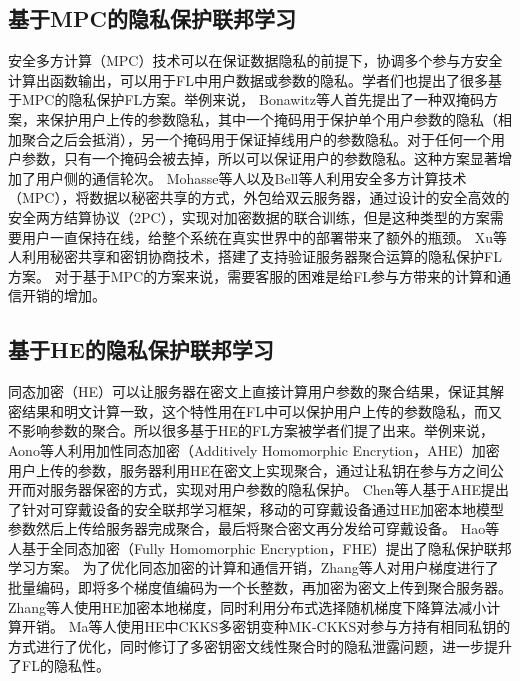 \subsection{基于MPC的隐私保护联邦学习}
安全多方计算（MPC）技术可以在保证数据隐私的前提下，协调多个参与方安全计算出函数输出，可以用于FL中用户数据或参数的隐私。学者们也提出了很多基于MPC的隐私保护FL方案\cite{bonawitz2017practical, mohassel2017secureml, mugunthan2019smpai, reich2019privacy, sharma2019secure, so2020scalable, xu2019hybridalpha, zhu2020privacy}。举例来说，
Bonawitz等人\cite{bonawitz2017practical}首先提出了一种双掩码方案，来保护用户上传的参数隐私，其中一个掩码用于保护单个用户参数的隐私（相加聚合之后会抵消），另一个掩码用于保证掉线用户的参数隐私。对于任何一个用户参数，只有一个掩码会被去掉，所以可以保证用户的参数隐私。这种方案显著增加了用户侧的通信轮次。
Mohasse等人\cite{mohassel2017secureml}以及Bell等人\cite{bell2020secure}利用安全多方计算技术（MPC），将数据以秘密共享的方式，外包给双云服务器，通过设计的安全高效的安全两方结算协议（2PC），实现对加密数据的联合训练，但是这种类型的方案需要用户一直保持在线，给整个系统在真实世界中的部署带来了额外的瓶颈。
Xu等人\cite{xu2019hybridalpha}利用秘密共享\cite{shamir1979share}和密钥协商技术\cite{hellman1976new}，搭建了支持验证服务器聚合运算的隐私保护FL方案。
对于基于MPC的方案来说，需要客服的困难是给FL参与方带来的计算和通信开销的增加。


\subsection{基于HE的隐私保护联邦学习}
同态加密（HE）可以让服务器在密文上直接计算用户参数的聚合结果，保证其解密结果和明文计算一致，这个特性用在FL中可以保护用户上传的参数隐私，而又不影响参数的聚合。所以很多基于HE的FL方案\cite{asad2020fedopt, chen2020fedhealth, dong2020eastfly, hao2019efficient, hardy2017private, aono2017privacy, zhang2020batchcrypt, zhang2020privacy, zhao2020smss}被学者们提了出来。举例来说，
Aono等人\cite{aono2017privacy}利用加性同态加密（Additively Homomorphic Encrytion，AHE）加密用户上传的参数，服务器利用HE在密文上实现聚合，通过让私钥在参与方之间公开而对服务器保密的方式，实现对用户参数的隐私保护。
Chen等人\cite{chen2020fedhealth}基于AHE提出了针对可穿戴设备的安全联邦学习框架，移动的可穿戴设备通过HE加密本地模型参数然后上传给服务器完成聚合，最后将聚合密文再分发给可穿戴设备。
Hao等人基于全同态加密（Fully Homomorphic Encryption，FHE）\cite{brakerski2014leveled}提出了隐私保护联邦学习方案。
为了优化同态加密的计算和通信开销，Zhang等人\cite{zhang2020batchcrypt}对用户梯度进行了批量编码，即将多个梯度值编码为一个长整数，再加密为密文上传到聚合服务器。
Zhang等人\cite{zhang2020privacy}使用HE加密本地梯度，同时利用分布式选择随机梯度下降算法减小计算开销。
Ma等人\cite{ma2021privacy}使用HE中CKKS多密钥变种MK-CKKS对参与方持有相同私钥的方式进行了优化，同时修订了多密钥密文线性聚合时的隐私泄露问题，进一步提升了FL的隐私性。


